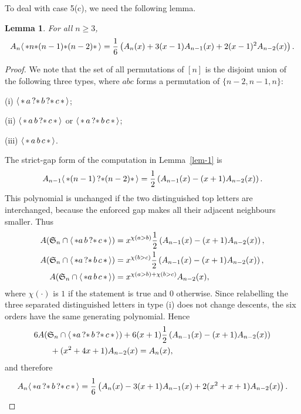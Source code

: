 \documentclass[11pt]{article}
\newtheorem{lem}[thm]{Lemma}
\newcommand{\sym}{\mathfrak{S}}
\newcommand{\st}{\mbox{\ensuremath{\ast}}}
\newcommand{\+}{\mbox{\ensuremath{\scriptstyle{+}}}}
\newcommand{\glob}[1]{\ensuremath{\langle\, #1\,\rangle}}
\begin{document}
To deal with case 5(c), we need the following lemma.
\begin{lem}\label{lem-length-3}
	For all $n\ge 3$,
	\begin{align*}
		A_n \glob{\st n\st (n-1)\st (n-2) \st }
		= \frac{1}{6} \left( A_{n}(x) + 3 (x-1) A_{n-1}(x) + 2(x-1)^2 A_{n-2}(x) \right).
	\end{align*}
\end{lem}
\begin{proof}
	We note that the set of all permutations of $[n]$ is the disjoint union of the following three types, where $abc$ forms a permutation of $\{n-2,n-1,n\}$:
	
	(i) $\glob{\st\,a\,?\st\,b\,?\st\,c\,\st}$;
	
	(ii) $\glob{\st\,a\,b\,?\st\,c\,\st}$ or $\glob{\st\,a\,?\st\,b\,c\,\st}$;
	
	(iii) $\glob{\st\,a\,b\,c\,\st}$.
	
	The strict-gap form of the computation in Lemma~\ref{lem-1} is
	\[
	A_{n-1}\glob{\st(n-1)\,?\st(n-2)\st}
	=\frac12\left(A_{n-1}(x)-(x+1)A_{n-2}(x)\right).
	\]
	This polynomial is unchanged if the two distinguished top letters are interchanged, because the enforced gap makes all their adjacent neighbours smaller.
	Thus
	\begin{align*}
		A(\sym_n\cap\glob{\st a\,b\,?\st\,c\,\st})
		&=x^{\chi(a>b)}\frac12\left(A_{n-1}(x)-(x+1)A_{n-2}(x)\right),\\
		A(\sym_n\cap\glob{\st a\,?\st\,b\,c\,\st})
		&=x^{\chi(b>c)}\frac12\left(A_{n-1}(x)-(x+1)A_{n-2}(x)\right),\\
		A(\sym_n\cap\glob{\st a\,b\,c\,\st})
		&=x^{\chi(a>b)+\chi(b>c)}A_{n-2}(x),
	\end{align*}
	where $\chi(\cdot)$ is $1$ if the statement is true and $0$ otherwise. Since relabelling the three separated distinguished letters in type (i) does not change descents, the six orders have the same generating polynomial. Hence
	\begin{align*}
		&6A(\sym_n\cap\glob{\st a\,?\st\,b\,?\st\,c\,\st})
		+6(x+1)\frac12\left(A_{n-1}(x)-(x+1)A_{n-2}(x)\right)\\
		&\qquad +(x^2+4x+1)A_{n-2}(x)=A_n(x),
	\end{align*}
	and therefore
	\begin{align*}
		A_n\glob{\st a\,?\st\,b\,?\st\,c\,\st}
		=\frac16\left(A_n(x)-3(x+1)A_{n-1}(x)+2(x^2+x+1)A_{n-2}(x)\right).
	\end{align*}
	

\end{proof}
\end{document}
